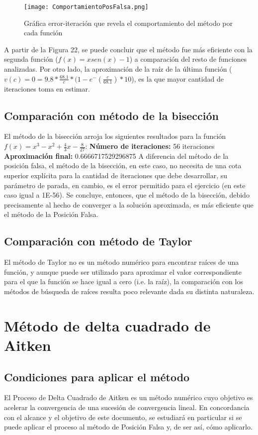 \documentclass{article}
\begin{document}
\begin{figure}[H]
    \centering
    \texttt{[image: ComportamientoPosFalsa.png]}
    \caption{Gráfica error-iteración que revela el comportamiento del método por cada función}
    \label{fig:ComportamientoPosFalsa}
\end{figure}

A partir de la Figura 22, se puede concluir que el método fue más eficiente con la segunda función (\(f(x) = xsen(x)-1\)) a comparación del resto de funciones analizadas. Por otro lado, la aproximación de la raíz de la última función (\(v(c) = 0 = 9.8* \frac{68.1}{c}*(1-e^-(\frac{c}{68.1})*10\)), es la que mayor cantidad de iteraciones toma en estimar.


\subsection{Comparación con método de la bisección}
El método de la bisección arroja los siguientes resultados para la función \(f(x) = x^3-x^2+\frac{4}{3}x-\frac{8}{27}\):
\textbf{Número de iteraciones:} 56 iteraciones
\textbf{Aproximación final:} 0.6666717529296875
A diferencia del método de la posición falsa, el método de la bisección, en este caso, no necesita de una cota superior explícita para la cantidad de iteraciones que debe desarrollar, su parámetro de parada, en cambio, es el error permitido para el ejercicio (en este caso igual a 1E-56). Se concluye, entonces, que el método de la bisección, debido precisamente al hecho de converger a la solución aproximada, es más eficiente que el método de la Posición Falsa.

\subsection{Comparación con método de Taylor}
El método de Taylor no es un método numérico para encontrar raíces de una función, y aunque puede ser utilizado para aproximar el valor correspondiente para el que la función se hace igual a cero (i.e. la raíz), la comparación con los métodos de búsqueda de raíces resulta poco relevante dada su distinta naturaleza.

\section{Método de delta cuadrado de Aitken}
\subsection{Condiciones para aplicar el método}
El Proceso de Delta Cuadrado de Aitken es un método numérico cuyo objetivo es acelerar la convergencia de una sucesión de convergencia lineal. En concordancia con el alcance y el objetivo de este documento, se estudiará en particular si se puede aplicar el proceso al método de Posición Falsa y, de ser así, cómo aplicarlo.
\end{document}
